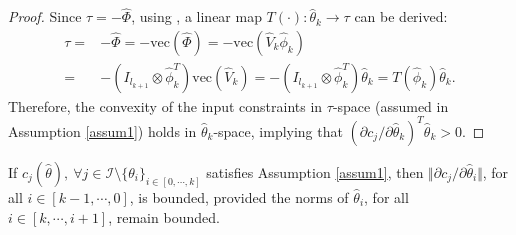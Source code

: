 \documentclass[lettersize,journal]{IEEEtran}
\begin{document}

\begin{proof}

Since $\tau = -\hat\Phi$, using \cite[Proposition 7.1.9]{RN17}, a linear map $T(\cdot):\hat\theta_k\to\tau$ can be derived: 
\begin{equation}\label{eq linear map}
    \begin{aligned}
    \tau = &-\hat\Phi = -\text{vec}(\hat\Phi)     = -\text{vec}(\hat V_k \hat\phi_k) 
    \\
    = & -(I_{l_{k+1}}\otimes \hat\phi_k^T)\text{vec}(\hat V_k)
    =-(I_{l_{k+1}}\otimes \hat\phi_k^T)\hat\theta_k = T(\hat\phi_k) \hat\theta_k.
    \end{aligned}
\end{equation}
Therefore, the convexity of the input constraints in $\tau$-space (assumed in Assumption \ref{assum1}) holds in $\hat\theta_k$-space, implying
that $(\partial c_j/\partial \hat\theta_k)^T\hat\theta_k>0$.

\end{proof}


\begin{lem} 
    If $c_j(\hat\theta),\ \forall j\in\mathcal I \setminus \{\theta_i\}_{i\in[0,\cdots,k]}$ satisfies Assumption \ref{assum1}, then $\Vert\partial c_j/\partial\hat\theta_i\Vert$, for all $i\in[k-1,\cdots, 0]$, is bounded, provided the norms of $\hat\theta_i$, for all $i\in[k,\cdots, i+1]$, remain bounded.
    \label{lem2}
\end{lem}
\end{document}
